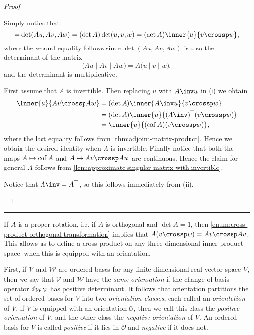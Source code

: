 \documentclass[article, a4paper, 11pt, oneside]{memoir}
\numberwithin{equation}{chapter}
\newcommand{\calV}{\mathcal{V}}
\newcommand{\calW}{\mathcal{W}}
\newcommand{\calO}{\mathcal{O}}
\newcommand{\trans}{^{\top}}
\newcommand\fleuronbreak{\fancybreak{\textcolor{linkcolor}{\adfhangingflatleafleft}}}
\begin{document}
\begin{proof}
\begin{proofsec}
    \item[Proof of (i)]
    Simply notice that
    \begin{equation*}
        [Au, Av, Aw]
            = \det(Au, Av, Aw)
            = (\det A) \det(u,v,w)
            = (\det A) \inner{u}{v \crossp w},
    \end{equation*}
    where the second equality follows since $\det(Au, Av, Aw)$ is also the determinant of the matrix
    \begin{equation*}
        \bigl( Au \mid Av \mid Aw \bigr)
            = A \bigl( u \mid v \mid w \bigr),
    \end{equation*}
    and the determinant is multiplicative.

    \item[Proof of (ii)]
    First assume that $A$ is invertible. Then replacing $u$ with $A\inv u$ in (i) we obtain
    \begin{align*}
        \inner{u}{Av \crossp Aw}
            &= (\det A) \inner{A\inv u}{v \crossp w} \\
            &= (\det A) \inner{u}{(A\inv)\trans (v \crossp w)} \\
            &=  \inner{u}{(\cof A)(v \crossp w)},
    \end{align*}
    where the last equality follows from \cref{thm:adjoint-matrix-product}. Hence we obtain the desired identity when $A$ is invertible. Finally notice that both the maps $A \mapsto \operatorname{cof} A$ and $A \mapsto Av \crossp Aw$ are continuous. Hence the claim for general $A$ follows from \cref{lem:approximate-singular-matrix-with-invertible}.

    \item[Proof of (iii)]
    Notice that $A\inv = A\trans$, so this follows immediately from (ii).
\end{proofsec}
\end{proof}

\fleuronbreak

If $A$ is a proper rotation, i.e. if $A$ is orthogonal and $\det A = 1$, then \cref{enum:cross-product-orthogonal-transformation} implies that $A(v \crossp w) = Av \crossp Av$. This allows us to define a cross product on any three-dimensional inner product space, when this is equipped with an orientation.

First, if $\calV$ and $\calW$ are ordered bases for any finite-dimensional real vector space $V$, then we say that $\calV$ and $\calW$ have the \emph{same orientation} if the change of basis operator $\basischange{\calW}{\calV}$ has positive determinant. It follows that orientation partitions the set of ordered bases for $V$ into two \emph{orientation classes}, each called an \emph{orientation} of $V$. If $V$ is equipped with an orientation $\calO$, then we call this class the \emph{positive orientation} of $V$, and the other class the \emph{negative orientation} of $V$. An ordered basis for $V$ is called \emph{positive} if it lies in $\calO$ and \emph{negative} if it does not.
\end{document}
